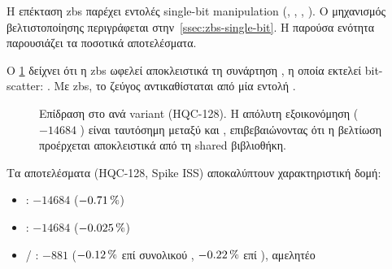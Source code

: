 
Η επέκταση \gls{zbs} παρέχει εντολές single-bit manipulation
(, , , ). Ο μηχανισμός
βελτιστοποίησης περιγράφεται στην~\cref{ssec:zbs-single-bit}. Η παρούσα
ενότητα παρουσιάζει τα ποσοτικά αποτελέσματα.

Ο \cref{fig:zbs-ablation} δείχνει ότι η \gls{zbs} ωφελεί αποκλειστικά
τη συνάρτηση , η οποία εκτελεί
bit-scatter: . Με \gls{zbs}, το
ζεύγος  αντικαθίσταται από μία εντολή .

\begin{figure}[htbp]
  \centering
  
  \caption[Επίδραση Zbs στο Decaps instret ανά variant (HQC-128)]{Επίδραση  στο \Decaps \instret ανά variant (HQC-128).
    Η απόλυτη εξοικονόμηση ($-\num{14684}$ \instret) είναι ταυτόσημη
    μεταξύ  και , επιβεβαιώνοντας
    ότι η βελτίωση προέρχεται αποκλειστικά από τη shared
     βιβλιοθήκη.}
  \label{fig:zbs-ablation}
\end{figure}

Τα αποτελέσματα (HQC-128, Spike ISS) αποκαλύπτουν χαρακτηριστική δομή:

\begin{itemize}
  \item {} \Decaps: $-\num{14684}$ \instret ($-\SI{0.71}{\percent}$)
  \item {} \Decaps: $-\num{14684}$ \instret ($-\SI{0.025}{\percent}$)
  \item {} / : $-\num{881}$ \instret
        ($-\SI{0.12}{\percent}$ επί συνολικού \KEM, $-\SI{0.22}{\percent}$ επί \Decaps), αμελητέο
\end{itemize}

